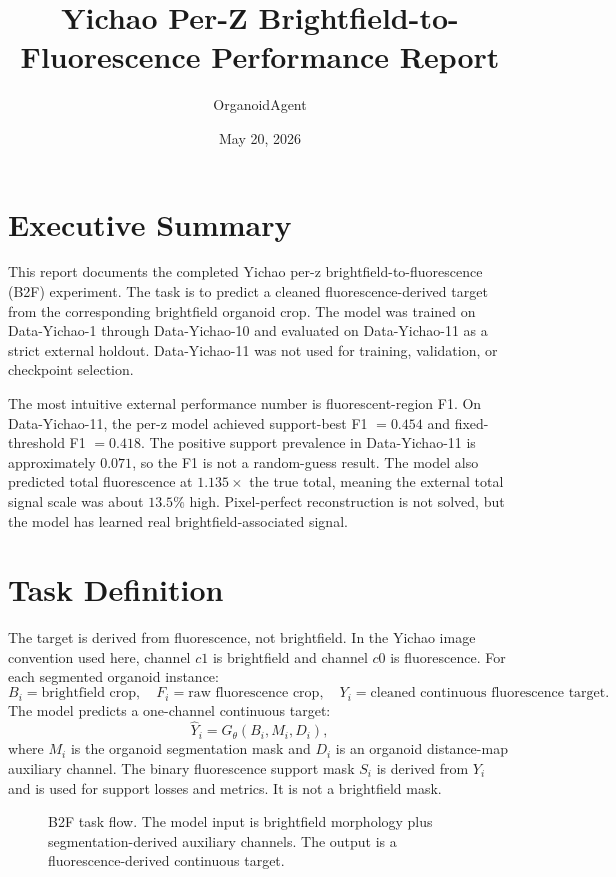 \documentclass[11pt]{article}
\title{Yichao Per-Z Brightfield-to-Fluorescence Performance Report}
\author{OrganoidAgent}
\date{May 20, 2026}
\begin{document}
\maketitle

\section*{Executive Summary}

This report documents the completed Yichao per-z brightfield-to-fluorescence (B2F) experiment. The task is to predict a cleaned fluorescence-derived target from the corresponding brightfield organoid crop. The model was trained on Data-Yichao-1 through Data-Yichao-10 and evaluated on Data-Yichao-11 as a strict external holdout. Data-Yichao-11 was not used for training, validation, or checkpoint selection.

The most intuitive external performance number is fluorescent-region F1. On Data-Yichao-11, the per-z model achieved support-best F1 \(=0.454\) and fixed-threshold F1 \(=0.418\). The positive support prevalence in Data-Yichao-11 is approximately \(0.071\), so the F1 is not a random-guess result. The model also predicted total fluorescence at \(1.135\times\) the true total, meaning the external total signal scale was about \(13.5\%\) high. Pixel-perfect reconstruction is not solved, but the model has learned real brightfield-associated signal.

\section*{Task Definition}

The target is derived from fluorescence, not brightfield. In the Yichao image convention used here, channel \(c1\) is brightfield and channel \(c0\) is fluorescence. For each segmented organoid instance:
\[
B_i = \text{brightfield crop}, \quad
F_i = \text{raw fluorescence crop}, \quad
Y_i = \text{cleaned continuous fluorescence target}.
\]
The model predicts a one-channel continuous target:
\[
\hat{Y}_i = G_\theta(B_i, M_i, D_i),
\]
where \(M_i\) is the organoid segmentation mask and \(D_i\) is an organoid distance-map auxiliary channel. The binary fluorescence support mask \(S_i\) is derived from \(Y_i\) and is used for support losses and metrics. It is not a brightfield mask.

\begin{figure}[H]
  \centering
  \caption{B2F task flow. The model input is brightfield morphology plus segmentation-derived auxiliary channels. The output is a fluorescence-derived continuous target.}
\end{figure}
\end{document}

